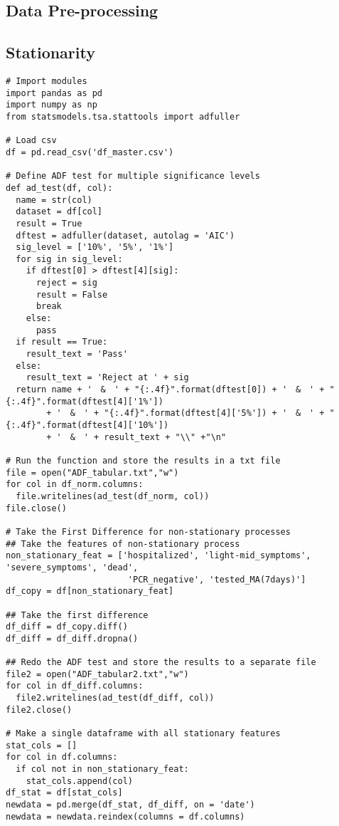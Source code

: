 \begin{appendices}

\section{Data Pre-processing}
\subsection{Stationarity}
\begin{verbatim}
# Import modules
import pandas as pd
import numpy as np
from statsmodels.tsa.stattools import adfuller

# Load csv
df = pd.read_csv('df_master.csv')

# Define ADF test for multiple significance levels
def ad_test(df, col):
  name = str(col)
  dataset = df[col]
  result = True
  dftest = adfuller(dataset, autolag = 'AIC')
  sig_level = ['10%', '5%', '1%']
  for sig in sig_level:
    if dftest[0] > dftest[4][sig]:
      reject = sig
      result = False
      break
    else:
      pass
  if result == True:
    result_text = 'Pass'
  else:
    result_text = 'Reject at ' + sig
  return name + '　&　' + "{:.4f}".format(dftest[0]) + '　&　' + "{:.4f}".format(dftest[4]['1%']) 
        + '　&　' + "{:.4f}".format(dftest[4]['5%']) + '　&　' + "{:.4f}".format(dftest[4]['10%'])
        + '　&　' + result_text + "\\" +"\n"

# Run the function and store the results in a txt file
file = open("ADF_tabular.txt","w")
for col in df_norm.columns:
  file.writelines(ad_test(df_norm, col))
file.close()

# Take the First Difference for non-stationary processes
## Take the features of non-stationary process
non_stationary_feat = ['hospitalized', 'light-mid_symptoms', 'severe_symptoms', 'dead',
                        'PCR_negative', 'tested_MA(7days)']
df_copy = df[non_stationary_feat]

## Take the first difference
df_diff = df_copy.diff()
df_diff = df_diff.dropna()

## Redo the ADF test and store the results to a separate file
file2 = open("ADF_tabular2.txt","w")
for col in df_diff.columns:
  file2.writelines(ad_test(df_diff, col))
file2.close()

# Make a single dataframe with all stationary features
stat_cols = []
for col in df.columns:
  if col not in non_stationary_feat:
    stat_cols.append(col)
df_stat = df[stat_cols]
newdata = pd.merge(df_stat, df_diff, on = 'date')
newdata = newdata.reindex(columns = df.columns)
\end{verbatim}


\end{appendices}
